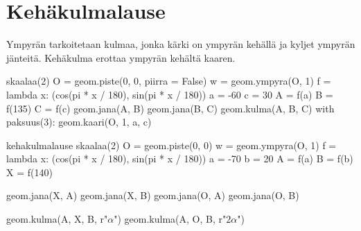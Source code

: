 \section*{Kehäkulmalause}

Ympyrän  tarkoitetaan kulmaa, jonka kärki on ympyrän kehällä ja kyljet ympyrän jänteitä. Kehäkulma erottaa ympyrän kehältä kaaren.
\begin{center}
\begin{kuva}
	skaalaa(2)
	O = geom.piste(0, 0, piirra = False)
	w = geom.ympyra(O, 1)
	f = lambda x: (cos(pi * x / 180), sin(pi * x / 180))
	a = -60
	c = 30
	A = f(a)
	B = f(135)
	C = f(c)
	geom.jana(A, B)
	geom.jana(B, C)
	geom.kulma(A, B, C)
	with paksuus(3):
		geom.kaari(O, 1, a, c)
\end{kuva}
\end{center}

\begin{luoKuva}{kehakulmalause}
	skaalaa(2)
	O = geom.piste(0, 0)
	w = geom.ympyra(O, 1)
	f = lambda x: (cos(pi * x / 180), sin(pi * x / 180))
	a = -70
	b = 20
	A = f(a)
	B = f(b)
	X = f(140)
	
	geom.jana(X, A)
	geom.jana(X, B)
	geom.jana(O, A)
	geom.jana(O, B)
	
	geom.kulma(A, X, B, r"$\alpha$")
	geom.kulma(A, O, B, r"$2\alpha$")
\end{luoKuva}


